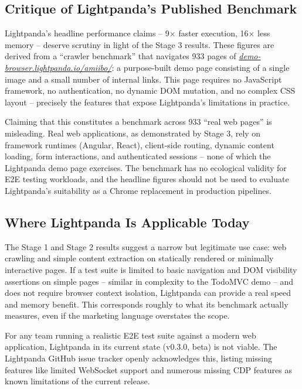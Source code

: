 \subsection{Critique of Lightpanda's Published Benchmark}

Lightpanda's headline performance claims -- 9$\times$ faster execution, 16$\times$ less memory -- deserve scrutiny in light of the Stage 3 results. These figures are derived from a ``crawler benchmark'' that navigates 933 pages of \textit{\url{demo-browser.lightpanda.io/amiibo/}}: a purpose-built demo page consisting of a single image and a small number of internal links. This page requires no JavaScript framework, no authentication, no dynamic DOM mutation, and no complex CSS layout -- precisely the features that expose Lightpanda's limitations in practice.

Claiming that this constitutes a benchmark across 933 ``real web pages'' is misleading. Real web applications, as demonstrated by Stage 3, rely on framework runtimes (Angular, React), client-side routing, dynamic content loading, form interactions, and authenticated sessions -- none of which the Lightpanda demo page exercises. The benchmark has no ecological validity for E2E testing workloads, and the headline figures should not be used to evaluate Lightpanda's suitability as a Chrome replacement in production pipelines.

\subsection{Where Lightpanda Is Applicable Today}

The Stage 1 and Stage 2 results suggest a narrow but legitimate use case: web crawling and simple content extraction on statically rendered or minimally interactive pages. If a test suite is limited to basic navigation and DOM visibility assertions on simple pages -- similar in complexity to the TodoMVC demo -- and does not require browser context isolation, Lightpanda can provide a real speed and memory benefit. This corresponds roughly to what its benchmark actually measures, even if the marketing language overstates the scope.

For any team running a realistic E2E test suite against a modern web application, Lightpanda in its current state (v0.3.0, beta) is not viable. The Lightpanda GitHub issue tracker openly acknowledges this, listing missing features like limited WebSocket support and numerous missing CDP features as known limitations of the current release.
